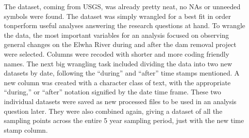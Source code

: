 \documentclass[12pt,]{article}
\begin{document}
The dataset, coming from USGS, was already pretty neat, no NAs or
unneeded symbols were found. The dataset was simply wrangled for a best
fit in order tonperform useful analyses answering the research questions
at hand. To wrangle the data, the most important variables for an
analysis focused on observing general changes on the Elwha River during
and after the dam removal project were selected. Columns were recoded
with shorter and more coding friendly names. The next big wrangling task
included dividing the data into two new datasets by date, following the
``during'' and ``after'' time stamps mentioned. A new column was created
with a character class of text, with the appropriate ``during,'' or
``after'' notation signified by the date time frame. These two
individual datasets were saved as new processed files to be used in an
analysis question later. They were also combined again, giving a dataset
of all the sampling points across the entire 5 year sampling period,
just with the new time stamp column.

\newpage
\end{document}
